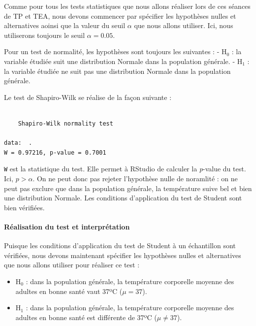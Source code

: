 \documentclass[a4paperpaper,]{article}
\newenvironment{Shaded}{\begin{snugshade}}{\end{snugshade}}
\newcommand{\KeywordTok}[1]{\textcolor[rgb]{0.12,0.11,0.11}{\textbf{#1}}}
\newcommand{\NormalTok}[1]{\textcolor[rgb]{0.12,0.11,0.11}{#1}}
\newcommand{\OperatorTok}[1]{\textcolor[rgb]{0.12,0.11,0.11}{#1}}
\newcommand{\StringTok}[1]{\textcolor[rgb]{0.75,0.01,0.01}{#1}}
\providecommand{\tightlist}{%
  \setlength{\itemsep}{0pt}\setlength{\parskip}{0pt}}
\let\oldparagraph\paragraph
\renewcommand{\paragraph}[1]{\oldparagraph{#1}\mbox{}}
\begin{document}
Comme pour tous les tests statistiques que nous allons réaliser lors de ces séances de TP et TEA, nous devons commencer par spécifier les hypothèses nulles et alternatives aoinsi que la valeur du seuil \(\alpha\) que nous allons utiliser. Ici, nous utiliserons toujours le seuil \(\alpha = 0.05\).

Pour un test de normalité, les hypothèses sont toujours les suivantes :
- H\(_0\) : la variable étudiée suit une distribution Normale dans la population générale.
- H\(_1\) : la variable étudiée ne suit pas une distribution Normale dans la population générale.

Le test de Shapiro-Wilk se réalise de la façon suivante :

\begin{Shaded}
\end{Shaded}

\begin{verbatim}

    Shapiro-Wilk normality test

data:  .
W = 0.97216, p-value = 0.7001
\end{verbatim}

\texttt{W} est la statistique du test. Elle permet à RStudio de calculer la \emph{p}-value du test. Ici, \(p > \alpha\). On ne peut donc pas rejeter l'hypothèse nulle de noramlité : on ne peut pas exclure que dans la population générale, la température suive bel et bien une distribution Normale. Les conditions d'application du test de Student sont bien vérifiées.

\hypertarget{realisation-du-test-et-interpretation}{%
\paragraph{Réalisation du test et interprétation}\label{realisation-du-test-et-interpretation}}

Puisque les conditions d'application du test de Student à un échantillon sont vérifiées, nous devons maintenant spécifier les hypothèses nulles et alternatives que nous allons utiliser pour réaliser ce test :

\begin{itemize}
\tightlist
\item
  H\(_0\) : dans la population générale, la température corporelle moyenne des adultes en bonne santé vaut 37ºC (\(\mu = 37\)).
\item
  H\(_1\) : dans la population générale, la température corporelle moyenne des adultes en bonne santé est différente de 37ºC (\(\mu \neq 37\)).
\end{itemize}
\end{document}
